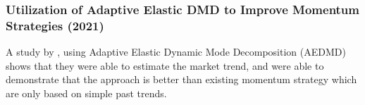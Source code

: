 \subsubsection{Utilization of Adaptive Elastic DMD to Improve Momentum Strategies (2021)}
\label{subsubsec:dmd_adaptive_elastic}
A study by , using Adaptive Elastic Dynamic Mode Decomposition 
(AEDMD) shows that they were able to estimate the market trend, and were able to 
demonstrate that the approach is better than existing momentum strategy which 
are only based on simple past trends.